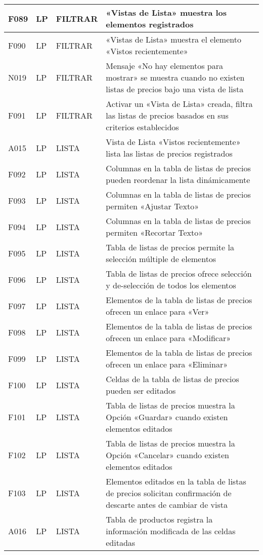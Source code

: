 \begin{landscape}
\begin{longtable}[htb]{|l|l|p{5.0cm}|p{13.0cm}|}
F089 & LP & FILTRAR & «Vistas de Lista» muestra los elementos registrados \\ \hline
F090 & LP & FILTRAR & «Vistas de Lista» muestra el elemento «Vistos recientemente» \\ \hline
N019 & LP & FILTRAR & Mensaje «No hay elementos para mostrar» se muestra cuando no existen listas de precios bajo una vista de lista \\ \hline
F091 & LP & FILTRAR & Activar un «Vista de Lista» creada, filtra las listas de precios basados en sus criterios establecidos \\ \hline
A015 & LP & LISTA & Vista de Lista «Vistos recientemente» lista las listas de precios registrados \\ \hline
F092 & LP & LISTA & Columnas en la tabla de listas de precios pueden reordenar la lista dinámicamente \\ \hline
F093 & LP & LISTA & Columnas en la tabla de listas de precios permiten «Ajustar Texto» \\ \hline
F094 & LP & LISTA & Columnas en la tabla de listas de precios permiten «Recortar Texto» \\ \hline
F095 & LP & LISTA & Tabla de listas de precios permite la selección múltiple de elementos \\ \hline
F096 & LP & LISTA & Tabla de listas de precios ofrece selección y de-selección de todos los elementos \\ \hline
F097 & LP & LISTA & Elementos de la tabla de listas de precios ofrecen un enlace para «Ver» \\ \hline
F098 & LP & LISTA & Elementos de la tabla de listas de precios ofrecen un enlace para «Modificar» \\ \hline
F099 & LP & LISTA & Elementos de la tabla de listas de precios ofrecen un enlace para «Eliminar» \\ \hline
F100 & LP & LISTA & Celdas de la tabla de listas de precios pueden ser editados \\ \hline
F101 & LP & LISTA & Tabla de listas de precios muestra la Opción «Guardar» cuando existen elementos editados \\ \hline
F102 & LP & LISTA & Tabla de listas de precios muestra la Opción «Cancelar» cuando existen elementos editados \\ \hline
F103 & LP & LISTA & Elementos editados en la tabla de listas de precios solicitan confirmación de descarte antes de cambiar de vista \\ \hline
A016 & LP & LISTA & Tabla de productos registra la información modificada de las celdas editadas \\ \hline

\end{longtable}
\end{landscape}
